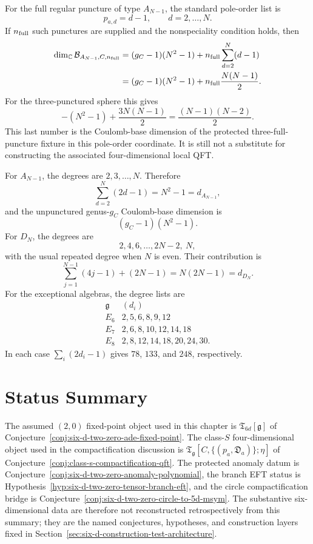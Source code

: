 \begin{example}
\label{ex:class-s-full-puncture-a-type-dimension}
For the full regular puncture of type \(A_{N-1}\), the standard pole-order
list is
\[
  p_{a,d}=d-1,\qquad d=2,\ldots,N .
\]
If \(n_{\rm full}\) such punctures are supplied and the nonspeciality
condition holds, then
\begin{align}
  \dim_{\mathbb C}\mathcal B_{A_{N-1},C,n_{\rm full}}
  &=
  (g_C-1)(N^2-1)
  +
  n_{\rm full}\sum_{d=2}^{N}(d-1)
  \notag\\
  &=
  (g_C-1)(N^2-1)
  +
  n_{\rm full}\frac{N(N-1)}2 .
  \label{eq:class-s-full-puncture-a-dimension}
\end{align}
For the three-punctured sphere this gives
\[
  -(N^2-1)+\frac{3N(N-1)}2
  =
  \frac{(N-1)(N-2)}2 .
\]
This last number is the Coulomb-base dimension of the protected
three-full-puncture fixture in this pole-order coordinate.  It is still not
a substitute for constructing the associated four-dimensional local QFT.
\end{example}

\begin{example}
\label{ex:ade-class-s-coulomb-dimension-checks}
For \(A_{N-1}\), the degrees are \(2,3,\ldots,N\).  Therefore
\[
  \sum_{d=2}^{N}(2d-1)=N^2-1=d_{A_{N-1}},
\]
and the unpunctured genus-\(g_C\) Coulomb-base dimension is
\[
  (g_C-1)(N^2-1).
\]
For \(D_N\), the degrees are
\[
  2,4,6,\ldots,2N-2,\ N,
\]
with the usual repeated degree when \(N\) is even.  Their contribution is
\[
  \sum_{j=1}^{N-1}(4j-1)+(2N-1)
  =
  N(2N-1)=d_{D_N}.
\]
For the exceptional algebras, the degree lists are
\[
\begin{array}{c|c}
  \mathfrak g & (d_i)\\ \hline
  E_6 & 2,5,6,8,9,12\\
  E_7 & 2,6,8,10,12,14,18\\
  E_8 & 2,8,12,14,18,20,24,30 .
\end{array}
\]
In each case \(\sum_i(2d_i-1)\) gives \(78\), \(133\), and \(248\),
respectively.
\end{example}

\section{Status Summary}

The assumed \((2,0)\) fixed-point object used in this chapter is
\(\mathfrak T_{6d}[\mathfrak g]\) of
Conjecture~\ref{conj:six-d-two-zero-ade-fixed-point}.  The class-\(S\)
four-dimensional object used in the compactification discussion is
\(\mathfrak T_{\mathfrak g}[C,\{(p_a,\mathfrak D_a)\};\eta]\) of
Conjecture~\ref{conj:class-s-compactification-qft}.  The protected anomaly
datum is Conjecture~\ref{conj:six-d-two-zero-anomaly-polynomial}, the branch
EFT status is Hypothesis~\ref{hyp:six-d-two-zero-tensor-branch-eft}, and the
circle compactification bridge is
Conjecture~\ref{conj:six-d-two-zero-circle-to-5d-msym}.  The substantive
six-dimensional data are therefore not reconstructed retrospectively from
this summary; they are the named conjectures, hypotheses, and construction
layers fixed in
Section~\ref{sec:six-d-construction-test-architecture}.


